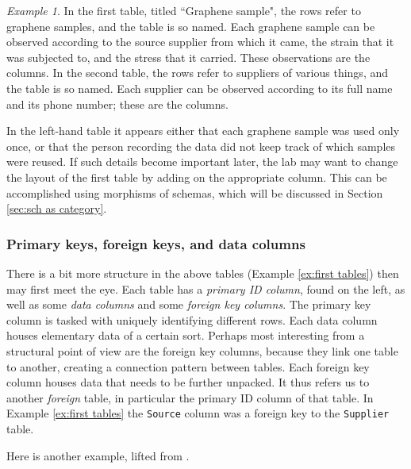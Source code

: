 \documentclass{book}
\theoremstyle{remark}
\newtheorem{example}[subsubsection]{Example}
\theoremstyle{definition}
\begin{document}
\begin{example}
In the first table, titled ``Graphene sample", the rows refer to graphene samples, and the table is so named. Each graphene sample can be observed according to the source supplier from which it came, the strain that it was subjected to, and the stress that it carried. These observations are the columns.  In the second table, the rows refer to suppliers of various things, and the table is so named. Each supplier can be observed according to its full name and its phone number; these are the columns.

In the left-hand table it appears either that each graphene sample was used only once, or that the person recording the data did not keep track of which samples were reused. If such details become important later, the lab may want to change the layout of the first table by adding on the appropriate column. This can be accomplished using morphisms of schemas, which will be discussed in Section \ref{sec:sch as category}.

\end{example}


\subsubsection{Primary keys, foreign keys, and data columns}

There is a bit more structure in the above tables (Example \ref{ex:first tables}) then may first meet the eye. Each table has a {\em primary ID column}, found on the left, as well as some {\em data columns} and some {\em foreign key columns}. The primary key column is tasked with uniquely identifying different rows. Each data column houses elementary data of a certain sort. Perhaps most interesting from a structural point of view are the foreign key columns, because they link one table to another, creating a connection pattern between tables. Each foreign key column houses data that needs to be further unpacked. It thus refers us to another {\em foreign} table, in particular the primary ID column of that table. In Example \ref{ex:first tables} the {\tt Source} column was a foreign key to the {\tt Supplier} table.

Here is another example, lifted from \cite{Sp2}.
\end{document}

